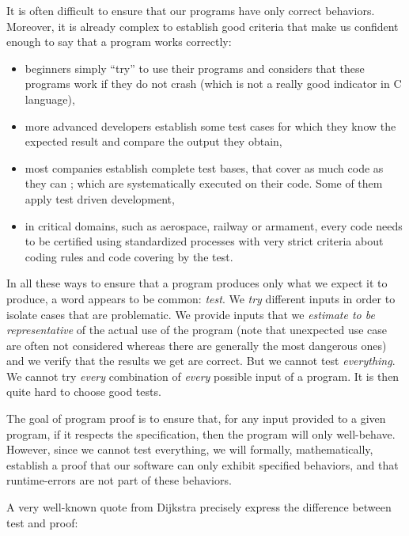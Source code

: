 

It is often difficult to ensure that our programs have only correct
behaviors. Moreover, it is already complex to establish good criteria
that make us confident enough to say that a program works correctly:



\begin{itemize}
\item
  beginners simply ``try'' to use their programs and considers that
  these programs work if they do not crash (which is not a really good
  indicator in C language),
\item
  more advanced developers establish some test cases for which they know
  the expected result and compare the output they obtain,
\item
  most companies establish complete test bases, that cover as much
  code as they can ; which are systematically executed on their code.
  Some of them apply test driven development,
\item
  in critical domains, such as aerospace, railway or armament, every
  code needs to be certified using standardized processes with very
  strict criteria about coding rules and code covering by the test.
\end{itemize}

In all these ways to ensure that a program produces only what we expect
it to produce, a word appears to be common: \emph{test}. We \emph{try}
different inputs in order to isolate cases that are problematic. We
provide inputs that we \emph{estimate to be representative} of the
actual use of the program (note that unexpected use case are often not
considered whereas there are generally the most dangerous ones) and we
verify that the results we get are correct. But we cannot test
\emph{everything}. We cannot try \emph{every} combination of
\emph{every} possible input of a program. It is then quite hard to
choose good tests.


The goal of program proof is to ensure that, for any input provided to a
given program, if it respects the specification, then the program will
only well-behave. However, since we cannot test everything, we will
formally, mathematically, establish a proof that our software can only
exhibit specified behaviors, and that runtime-errors are not part of
these behaviors.



A very well-known quote from Dijkstra precisely express the difference
between test and proof:



